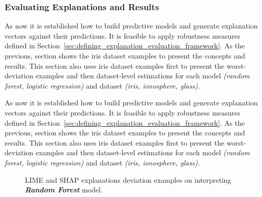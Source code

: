 \documentclass[english]{tktltiki2}
\theoremstyle{definition}
\theoremstyle{remark}
\begin{document}
\subsubsection{Evaluating Explanations and Results}
As now it is established how to build predictive models and generate explanation vectors against their predictions. It is feasible to apply robustness measures defined in Section~\ref{sec:defining_explanation_evaluation_framework}. As the previous, section shows the iris dataset examples to present the concepts and results. This section also uses iris dataset examples first to present the worst-deviation examples and then dataset-level estimations for each model \textit{(random forest, logistic regression)} and dataset \textit{(iris, ionosphere, glass)}.

As now it is established how to build predictive models and generate explanation vectors against their predictions. It is feasible to apply robustness measures defined in Section~\ref{sec:defining_explanation_evaluation_framework}. As the previous, section shows the iris dataset examples to present the concepts and results. This section also uses iris dataset examples first to present the worst-deviation examples and then dataset-level estimations for each model \textit{(random forest, logistic regression)} and dataset \textit{(iris, ionosphere, glass)}.





\begin{figure}[htp]
	\hspace*{\fill}%
	\caption{{LIME and SHAP explanations deviation examples on interpreting \textbf{\textit{Random Forest}} model.}}%
	\label{fig:iris_rf_deviation_stability}%
\end{figure}
\end{document}
